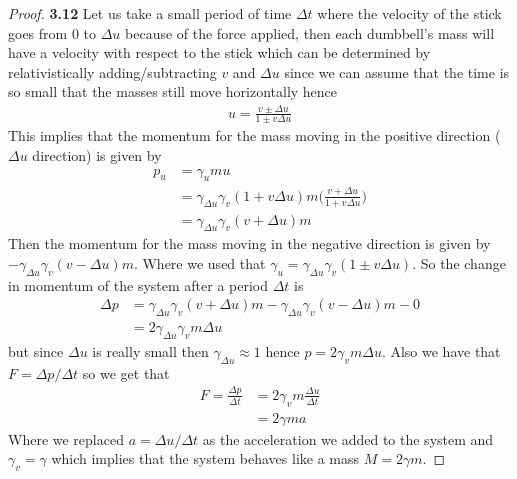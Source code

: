 \documentclass[11pt]{article}
\theoremstyle{definition}
\begin{document}
\begin{proof}{\textbf{3.12}}
    Let us take a small period of time $\Delta t$ where the velocity of the
    stick goes from $0$ to $\Delta u$ because of the force applied, then
    each dumbbell's mass will have a velocity with respect to
    the stick which can be determined by relativistically adding/subtracting
    $v$ and $\Delta u$ since we can assume that the time is so small that the
    masses still move horizontally hence
    \begin{align*}
        u = \frac{v \pm \Delta u}{1 \pm v\Delta u}
    \end{align*}
    This implies that the momentum for the mass moving in the positive
    direction ($\Delta u$ direction) is given by 
    \begin{align*}
        p_u &= \gamma_u m u\\
        &= \gamma_{\Delta u} \gamma_v (1 + v\Delta u)m
        \bigg(\frac{v + \Delta u}{1 + v\Delta u}\bigg)\\
        &= \gamma_{\Delta u} \gamma_v (v+ \Delta u)m
    \end{align*}
    Then the momentum for the mass moving in the negative direction is
    given by $-\gamma_{\Delta u} \gamma_v (v - \Delta u)m$.
    Where we used that $\gamma_u = \gamma_{\Delta u} \gamma_v (1 \pm v\Delta u)$.
    So the change in momentum of the system after a period $\Delta t$ is
    \begin{align*}
        \Delta p &= \gamma_{\Delta u} \gamma_v (v + \Delta u)m
        - \gamma_{\Delta u} \gamma_v (v - \Delta u)m - 0\\
        &= 2 \gamma_{\Delta u} \gamma_v m \Delta u
    \end{align*}
    but since $\Delta u$ is really small then $\gamma_{\Delta u} \approx 1$
    hence $p = 2\gamma_v m \Delta u$. Also we have that $F = \Delta p / \Delta t$
    so we get that 
    \begin{align*}
        F = \frac{\Delta p}{\Delta t} &= 2\gamma_v m \frac{\Delta u}{\Delta t}\\
        &= 2\gamma m a
    \end{align*}
    Where we replaced $a = \Delta u/\Delta t$ as the acceleration we added to
    the system and $\gamma_v = \gamma$ which implies that the system behaves
    like a mass $M = 2\gamma m$.    
\end{proof}
\cleardoublepage
\end{document}
